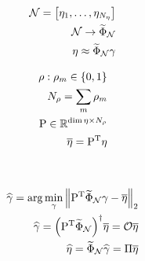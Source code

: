 \begin{align}
    \mathcal{N} =
    \begin{bmatrix}
        \mathbf{\eta}_1, \dots,  \mathbf{\eta}_{N_{\mathbf{\eta}}}
    \end{bmatrix} \\
    \mathcal{N} \rightarrow \widetilde{\Phi}_\mathcal{N} \\
    \mathbf{\eta} \approx \widetilde{\Phi}_\mathcal{N} \mathbf{\gamma}
\end{align}

\begin{align}
   \bvec{\rho} : \rho_m \in \left\{0, 1 \right\} \\
   N_{\bvec{\rho}} = \sum_m \rho_m \\
   \matr{P} \in \mathbb{R}^{\dim{\nlin} \times N_{\bvec{\rho}}} \\
   \overline{\nlin} = \transpose{P} \nlin
\end{align}

\begin{figure}[ht]
    \caption{~\cite{Elizarev2022}}\label{fig:gappy}
\end{figure}

\begin{align}
    \widehat{\bvec{\gamma}} = \arg \min_{\bvec{\gamma}} \norm[2]{\transpose{P} \widetilde{\Phi}_\mathcal{N} \bvec{\gamma} - \overline{\nlin}} \\
    \widehat{\bvec{\gamma}} = {\left( \transpose{P} \widetilde{\Phi}_\mathcal{N} \right)}^\dagger \overline{\nlin} = \mathcal{O} \overline{\nlin} \\
    \widehat{\nlin} = \widetilde{\Phi}_\mathcal{N} \widehat{\bvec{\gamma}} = \matr{\Pi} \overline{\nlin}
\end{align}


